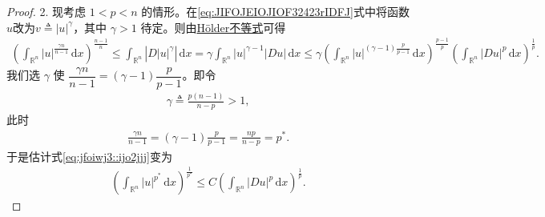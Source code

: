 \documentclass[../../main.tex]{subfiles}
\begin{document}
\begin{proof}
2. 现考虑 $1<p<n$ 的情形。在\eqref{eq:JIFOJEIOJIOF32423rIDFJ}式中将函数$u$改为$v\triangleq|u|^{\gamma}$，其中 $\gamma>1$ 待定。则由\hyperref[Real Analysis-theorem:实变函数--Hölder不等式]{Hölder不等式}可得
\begin{align}\label{eq:jfoiwj3::ijo2jjj}
\left(\int_{\mathbb{R}^{n}}|u|^{\frac{\gamma n}{n-1}}\,\mathrm{d}x\right)^{\frac{n-1}{n}}
\leqslant\int_{\mathbb{R}^{n}}\left|D|u|^{\gamma}\right|\,\mathrm{d}x
=\gamma\int_{\mathbb{R}^{n}}|u|^{\gamma-1}|Du|\,\mathrm{d}x
\leqslant\gamma\left(\int_{\mathbb{R}^{n}}|u|^{(\gamma-1)\frac{p}{p-1}}\,\mathrm{d}x\right)^{\frac{p-1}{p}}
\left(\int_{\mathbb{R}^{n}}|Du|^{p}\,\mathrm{d}x\right)^{\frac{1}{p}}.
\end{align}
我们选 $\gamma$ 使 $\dfrac{\gamma n}{n-1}=(\gamma-1)\dfrac{p}{p-1}$。即令
\begin{align*}
\gamma\triangleq\frac{p(n-1)}{n-p}>1,
\end{align*}
此时
\begin{align*}
\frac{\gamma n}{n-1}=(\gamma-1)\frac{p}{p-1}=\frac{np}{n-p}=p^{*}.
\end{align*}
于是估计式\eqref{eq:jfoiwj3::ijo2jjj}变为
\begin{align*}
\left(\int_{\mathbb{R}^{n}}|u|^{p^{*}}\,\mathrm{d}x\right)^{\frac{1}{p^{*}}}
\leqslant C\left(\int_{\mathbb{R}^{n}}|Du|^{p}\,\mathrm{d}x\right)^{\frac{1}{p}}.
\end{align*}
\end{proof}
\end{document}
